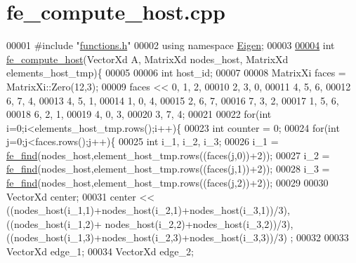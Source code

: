 \hypertarget{fe__compute__host_8cpp_source}{}\section{fe\+\_\+compute\+\_\+host.\+cpp}
\label{fe__compute__host_8cpp_source}

\begin{DoxyCode}
00001 \textcolor{preprocessor}{#include "\hyperlink{functions_8h}{functions.h}"}
00002 \textcolor{keyword}{using namespace }\hyperlink{namespace_eigen}{Eigen};
00003 
\hyperlink{fe__compute__host_8cpp_a453ba6bc1e7d5a63db9d56beb6077a27}{00004} \textcolor{keywordtype}{int} \hyperlink{fe__compute__host_8cpp_a453ba6bc1e7d5a63db9d56beb6077a27}{fe\_compute\_host}(VectorXd A, MatrixXd nodes\_host, MatrixXd elements\_host\_tmp)\{
00005 
00006     \textcolor{keywordtype}{int} host\_id;
00007 
00008     MatrixXi faces = MatrixXi::Zero(12,3);
00009     faces << 0, 1, 2,
00010             2, 3, 0,
00011             4, 5, 6,
00012             6, 7, 4,
00013             4, 5, 1,
00014             1, 0, 4,
00015             2, 6, 7,
00016             7, 3, 2,
00017             1, 5, 6,
00018             6, 2, 1,
00019             4, 0, 3,
00020             3, 7, 4;
00021 
00022     \textcolor{keywordflow}{for}(\textcolor{keywordtype}{int} i=0;i<elements\_host\_tmp.rows();i++)\{
00023         \textcolor{keywordtype}{int} counter = 0;
00024         \textcolor{keywordflow}{for}(\textcolor{keywordtype}{int} j=0;j<faces.rows();j++)\{
00025             \textcolor{keywordtype}{int} i\_1, i\_2, i\_3;
00026             i\_1 = \hyperlink{functions_8h_a983304137f9a961469a558437d5d2d59}{fe\_find}(nodes\_host,element\_host\_tmp.rows((faces(j,0))+2));
00027             i\_2 = \hyperlink{functions_8h_a983304137f9a961469a558437d5d2d59}{fe\_find}(nodes\_host,element\_host\_tmp.rows((faces(j,1))+2));
00028             i\_3 = \hyperlink{functions_8h_a983304137f9a961469a558437d5d2d59}{fe\_find}(nodes\_host,element\_host\_tmp.rows((faces(j,2))+2));
00029 
00030             VectorXd center;
00031             center << ((nodes\_host(i\_1,1)+nodes\_host(i\_2,1)+nodes\_host(i\_3,1))/3), ((nodes\_host(i\_1,2)+
      nodes\_host(i\_2,2)+nodes\_host(i\_3,2))/3), ((nodes\_host(i\_1,3)+nodes\_host(i\_2,3)+nodes\_host(i\_3,3))/3) ;
00032 
00033             VectorXd edge\_1;
00034             VectorXd edge\_2;

\end{DoxyCode}
